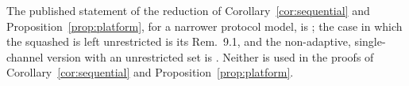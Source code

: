 
\begin{remark}\label{rem:platform-published}
The published statement of the reduction of Corollary~\ref{cor:sequential}
and Proposition~\ref{prop:platform}, for a narrower protocol model, is
\cite[Lemma~9.3, Eqs.~(146)--(148)]{tupkary2026decoy}; the case in which the
squashed  is left unrestricted is its Rem.~9.1, and the
non-adaptive, single-channel version with an unrestricted set is
\cite[Lemma~6]{nahar2024postselection}. Neither is used in the proofs of
Corollary~\ref{cor:sequential} and Proposition~\ref{prop:platform}.
\end{remark}
